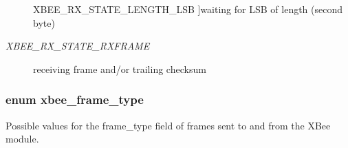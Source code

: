 \begin{Desc}
\begin{description}
{\hypertarget{group__xbee__device_gga30374ada0aff261c5da7557882fd09deafc90aadcdd6ea17637198aadd9d85efd}{X\-B\-E\-E\-\_\-\-R\-X\-\_\-\-S\-T\-A\-T\-E\-\_\-\-L\-E\-N\-G\-T\-H\-\_\-\-L\-S\-B}\label{group__xbee__device_gga30374ada0aff261c5da7557882fd09deafc90aadcdd6ea17637198aadd9d85efd}
}]waiting for L\-S\-B of length (second byte) \item[{\em 
\hypertarget{group__xbee__device_gga30374ada0aff261c5da7557882fd09deae7792cb93b09dde7b061947daffcb35a}{X\-B\-E\-E\-\_\-\-R\-X\-\_\-\-S\-T\-A\-T\-E\-\_\-\-R\-X\-F\-R\-A\-M\-E}\label{group__xbee__device_gga30374ada0aff261c5da7557882fd09deae7792cb93b09dde7b061947daffcb35a}
}]receiving frame and/or trailing checksum \end{description}
\end{Desc}

\hypertarget{group__xbee__device_ga7753bbebaf00d6d64942f64b6ae9b7b9}{
\subsubsection[{xbee\-\_\-frame\-\_\-type}]{\setlength{\rightskip}{0pt plus 5cm}enum {\bf xbee\-\_\-frame\-\_\-type}}}\label{group__xbee__device_ga7753bbebaf00d6d64942f64b6ae9b7b9}


Possible values for the {\ttfamily frame\-\_\-type} field of frames sent to and from the X\-Bee module. 

